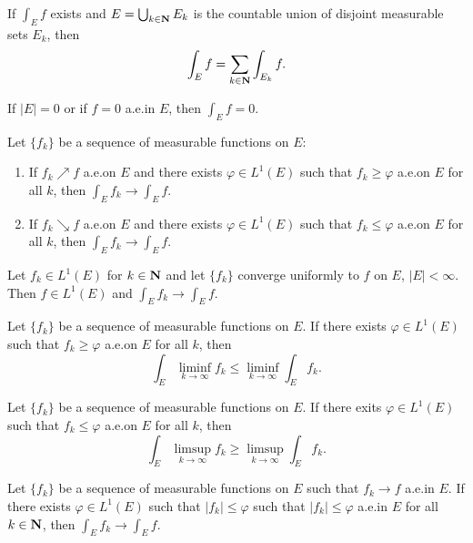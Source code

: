 \begin{theorem*}[5.24]
If $\int_E f$ exists and $E=\bigcup_{k\in\mathbf{N}} E_k$ is the countable union
of disjoint measurable sets $E_k$, then
\[
\int_E f=\sum_{k\in\mathbf{N}}\int_{E_k}f.
\]
\end{theorem*}
\begin{theorem*}[5.25]
If $|E|=0$ or if $f=0$ a.e.\@ in $E$, then $\int_E f=0$.
\end{theorem*}
\begin{theorem*}
Let $\{f_k\}$ be a sequence of measurable functions on $E$:
\begin{enumerate}[label=\textnormal{(\roman*)}]
\item If $f_k\nearrow f$ a.e.\@ on $E$ and there exists $\varphi\in L^1(E)$ such
  that $f_k\geq\varphi$ a.e.\@ on $E$ for all $k$, then $\int_E
  f_k\to\int_E f$.
\item If $f_k\searrow f$ a.e.\@ on $E$ and there exists $\varphi\in L^1(E)$ such
  that $f_k\leq\varphi$ a.e.\@ on $E$ for all $k$, then $\int_E
  f_k\to\int_E f$.
\end{enumerate}
\end{theorem*}
\begin{theorem*}
Let $f_k\in L^1(E)$ for $k\in\mathbf{N}$ and let $\{f_k\}$ converge uniformly to
$f$ on $E$, $|E|<\infty$. Then $f\in L^1(E)$ and $\int_E f_k\to\int_E f$.
\end{theorem*}
\begin{theorem*}
Let $\{f_k\}$ be a sequence of measurable functions on $E$. If there exists
$\varphi\in L^1(E)$ such that $f_k\geq\varphi$ a.e.\@ on $E$ for all $k$,
then
\[
\int_E\liminf_{k\to\infty} f_k\leq\liminf_{k\to\infty}\int_E f_k.
\]
\end{theorem*}
\begin{corollary*}
Let $\{f_k\}$ be a sequence of measurable functions on $E$. If there exits
$\varphi\in L^1(E)$ such that $f_k\leq\varphi$ a.e.\@ on $E$ for all $k$,
then
\[
\int_E\limsup_{k\to\infty} f_k\geq\limsup_{k\to\infty}\int_E f_k.
\]
\end{corollary*}
\begin{theorem*}
Let $\{f_k\}$ be a sequence of measurable functions on $E$ such that
$f_k\to f$ a.e.\@ in $E$. If there exists $\varphi\in L^1(E)$ such that
$|f_k|\leq\varphi$  such that $|f_k|\leq\varphi$ a.e.\@ in $E$ for all
$k\in\mathbf{N}$, then $\int_E f_k\to\int_E f$.
\end{theorem*}
